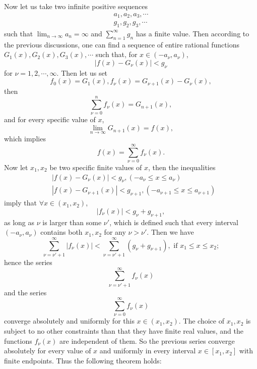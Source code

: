 \documentclass{article}
\begin{document}
Now let us take two infinite positive sequences
\begin{align*}
a_1,a_2,a_3,\cdots\\
g_1,g_2,g_3,\cdots
\end{align*}
such that $\lim_{n\rightarrow\infty}a_n=\infty$ and $\sum_{n=1}^{\infty} g_n$ has a finite value. Then according to the previous discussions, one can find a sequence of entire rational functions $G_1(x),G_2(x),G_3(x),\cdots$ such that, for $x\in(-a_\nu, a_\nu)$,
\begin{equation*}
|f(x)-G_\nu(x)|<g_\nu
\end{equation*}
for $\nu=1,2,\cdots,\infty$. Then let us set
\begin{equation*}
f_0(x)=G_1(x),f_\nu(x)=G_{\nu+1}(x)-G_\nu(x),
\end{equation*}
then 
\begin{equation*}
\sum_{\nu=0}^n f_\nu(x)=G_{n+1}(x),
\end{equation*}
and for every specific value of $x$,
\begin{equation*}
\lim_{n\rightarrow\infty} G_{n+1}(x)=f(x),
\end{equation*}
which implies
\begin{equation*}
f(x)=\sum_{\nu=0}^\infty f_\nu(x).
\end{equation*}
Now let $x_1,x_2$ be two specific finite values of $x$, then the inequalities
\begin{align*}
&|f(x)-G_\nu(x)|<g_\nu, (-a_\nu\leq x\leq a_\nu)\\
&|f(x)-G_{\nu+1}(x)|<g_{\nu+1}, (-a_{\nu+1}\leq x\leq a_{\nu+1})
\end{align*}
imply that $\forall x\in(x_1,x_2)$,
\begin{equation*}
|f_\nu(x)|<g_\nu+g_{\nu+1},
\end{equation*}
as long as $\nu$ is larger than some $\nu'$, which is defined such that every interval $(-a_\nu, a_\nu)$ contains both $x_1,x_2$ for any $\nu>\nu'$. Then we have
\begin{equation*}
\sum_{\nu=\nu'+1}^\infty |f_\nu(x)|<\sum_{\nu=\nu'+1}^\infty (g_\nu+g_{\nu+1}), \text{ if }x_1\leq x\leq x_2;
\end{equation*}
hence the series 
\begin{equation*}
\sum_{\nu=\nu'+1}^\infty f_\nu(x)
\end{equation*}
and the series
\begin{equation*}
\sum_{\nu=0}^\infty f_\nu(x)
\end{equation*}
converge absolutely and uniformly for this $x\in(x_1,x_2)$. The choice of $x_1,x_2$ is subject to no other constraints than that they have finite real values, and the functions $f_\nu(x)$ are independent of them. So the previous series converge absolutely for every value of $x$ and uniformly in every interval $x\in[x_1,x_2]$ with finite endpoints. Thus the following theorem holds:
\end{document}
